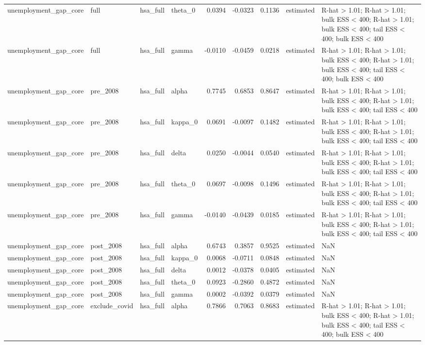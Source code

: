 \begin{tabular}{llllrrrll}
unemployment\_gap\_core & full & hsa\_full & theta\_0 & 0.0394 & -0.0323 & 0.1136 & estimated & R-hat > 1.01; R-hat > 1.01; bulk ESS < 400; R-hat > 1.01; bulk ESS < 400; tail ESS < 400; bulk ESS < 400 \\
unemployment\_gap\_core & full & hsa\_full & gamma & -0.0110 & -0.0459 & 0.0218 & estimated & R-hat > 1.01; R-hat > 1.01; bulk ESS < 400; R-hat > 1.01; bulk ESS < 400; tail ESS < 400; bulk ESS < 400 \\
unemployment\_gap\_core & pre\_2008 & hsa\_full & alpha & 0.7745 & 0.6853 & 0.8647 & estimated & R-hat > 1.01; R-hat > 1.01; bulk ESS < 400; R-hat > 1.01; bulk ESS < 400; tail ESS < 400 \\
unemployment\_gap\_core & pre\_2008 & hsa\_full & kappa\_0 & 0.0691 & -0.0097 & 0.1482 & estimated & R-hat > 1.01; R-hat > 1.01; bulk ESS < 400; R-hat > 1.01; bulk ESS < 400; tail ESS < 400 \\
unemployment\_gap\_core & pre\_2008 & hsa\_full & delta & 0.0250 & -0.0044 & 0.0540 & estimated & R-hat > 1.01; R-hat > 1.01; bulk ESS < 400; R-hat > 1.01; bulk ESS < 400; tail ESS < 400 \\
unemployment\_gap\_core & pre\_2008 & hsa\_full & theta\_0 & 0.0697 & -0.0098 & 0.1496 & estimated & R-hat > 1.01; R-hat > 1.01; bulk ESS < 400; R-hat > 1.01; bulk ESS < 400; tail ESS < 400 \\
unemployment\_gap\_core & pre\_2008 & hsa\_full & gamma & -0.0140 & -0.0439 & 0.0185 & estimated & R-hat > 1.01; R-hat > 1.01; bulk ESS < 400; R-hat > 1.01; bulk ESS < 400; tail ESS < 400 \\
unemployment\_gap\_core & post\_2008 & hsa\_full & alpha & 0.6743 & 0.3857 & 0.9525 & estimated & NaN \\
unemployment\_gap\_core & post\_2008 & hsa\_full & kappa\_0 & 0.0068 & -0.0711 & 0.0848 & estimated & NaN \\
unemployment\_gap\_core & post\_2008 & hsa\_full & delta & 0.0012 & -0.0378 & 0.0405 & estimated & NaN \\
unemployment\_gap\_core & post\_2008 & hsa\_full & theta\_0 & 0.0923 & -0.2860 & 0.4872 & estimated & NaN \\
unemployment\_gap\_core & post\_2008 & hsa\_full & gamma & 0.0002 & -0.0392 & 0.0379 & estimated & NaN \\
unemployment\_gap\_core & exclude\_covid & hsa\_full & alpha & 0.7866 & 0.7063 & 0.8683 & estimated & R-hat > 1.01; R-hat > 1.01; bulk ESS < 400; R-hat > 1.01; bulk ESS < 400; tail ESS < 400; bulk ESS < 400 \\

\end{tabular}
